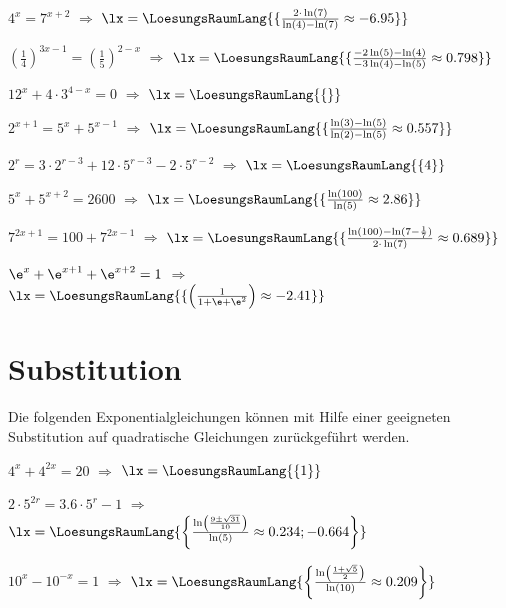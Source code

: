 \begin{bbwAufgabenBlock}
\item $4^x=7^{x+2}$ $\Longrightarrow$ $\lx=\LoesungsRaumLang{\{\frac{2\cdot{}\ln(7)}{\ln(4)-\ln(7)} \approx -6.95   \}}$ 
\item $\left(\frac14\right)^{3x-1} = \left(\frac15\right)^{2-x}$ $\Longrightarrow$ $\lx=\LoesungsRaumLang{\{\frac{-2\ln(5)-\ln(4)}{-3\ln(4)-\ln(5)} \approx 0.798   \}}$ \noTRAINER{\seitenUmbruchImAufgabenteil{}}
\item $12^x+4\cdot{}3^{4-x}=0$ $\Longrightarrow$
$\lx=\LoesungsRaumLang{\{   \}}$   
\item $2^{x+1}=5^x + 5^{x-1}$ $\Longrightarrow$ $\lx=\LoesungsRaumLang{\{\frac{\ln(3)-\ln(5)}{\ln(2)-\ln(5)} \approx 0.557   \}}$  \noTRAINER{\seitenUmbruchImAufgabenteil{}}
\item $2^r=3\cdot{}2^{r-3} + 12\cdot{}5^{r-3} - 2\cdot{}5^{r-2}$ $\Longrightarrow$ $\lx=\LoesungsRaumLang{\{ 4 \}}$ 
\item $5^x + 5^{x+2} = 2600$ $\Longrightarrow$ $\lx=\LoesungsRaumLang{\{\frac{\ln(100)}{\ln(5)} \approx 2.86   \}}$  \noTRAINER{\seitenUmbruchImAufgabenteil{}}
\item $7^{2x+1} = 100 + 7^{2x-1}$ $\Longrightarrow$ $\lx=\LoesungsRaumLang{\{\frac{\ln(100) - \ln(7-\frac17)}{2\cdot{}\ln(7)} \approx  0.689  \}}$ 
\item $\e^x + \e^{x+1} + \e^{x+2} = 1$ $\Longrightarrow$ $\lx=\LoesungsRaumLang{\{\left(\frac{1}{1+\e+\e^2}\right) \approx -2.41  \}}$ 

\end{bbwAufgabenBlock}

\newpage{}%

\section{Substitution}
Die folgenden Exponentialgleichungen können mit Hilfe einer geeigneten
Substitution auf quadratische Gleichungen zurückgeführt werden.

\begin{bbwAufgabenBlock}
\item $4^x + 4^{2x} = 20$ $\Longrightarrow$ $\lx=\LoesungsRaumLang{\{  1   \}}$ 
\item $2\cdot{}5^{2r} = 3.6\cdot{}5^r - 1$ $\Longrightarrow$
$\lx=\LoesungsRaumLang{\left\{   \frac{\ln\left(\frac{9\pm\sqrt{31}}{10}\right)}{\ln(5)} \approx
0.234; -0.664 \right\}
}$

\noTRAINER{\seitenUmbruchImAufgabenteil{}}

\item $10^x - 10^{-x} = 1$ $\Longrightarrow$ $\lx=\LoesungsRaumLang{\left\{  \frac{\ln\left(\frac{1+\sqrt{5}}{2}\right)}{\ln(10)} \approx  0.209   \right\}}$ 

\end{bbwAufgabenBlock}
\platzFuerBerechnungenBisEndeSeite{}

